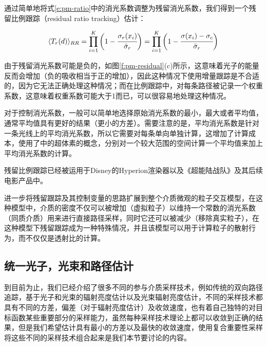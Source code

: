通过简单地将式\ref{e:pm-ratio}中的消光系数调整为残留消光系数，我们得到一个残留比例跟踪（residual ratio tracking）估计：

\begin{equation}
	\langle T_r(d)\rangle_{RR}=\prod^{K}_{i=1}\bigg(1- \cfrac{\sigma_r(x_i)}{\bar{\sigma}_r}\bigg)=\prod^{K}_{i=1}\bigg(1- \cfrac{\sigma(x_i)-\sigma_c}{\bar{\sigma}_r}\bigg)
\end{equation}

由于残留消光系数可能是负的，如图\ref{f:pm-residual}(c)所示，这意味着光子的能量反而会增加（负的吸收相当于正的增加），因此这种情况下使用增量跟踪是不合适的，因为它无法正确处理这种情况；而在比例跟踪中，对每条路径被记录一个权重系数，这意味着权重系数可能大于1而已，可以很容易地处理这种情况。

对于控制消光系数，一般可以简单地选择原始消光系数的最小，最大或者平均值，通常平均值具有更好的结果（更小的方差）。需要注意的是，平均消光系数是针对一条光线上的平均消光系数，所以它需要对每条单向单独计算，这增加了计算成本，\cite{a:ResidualRatioTrackingforEstimatingAttenuationinParticipatingMedia}使用了\cite{a:FreePathSamplinginHighResolutionInhomogeneousParticipatingMedia}中的超体素的概念，分别对一个较大范围的空间计算一个平均值来加上平均消光系数的计算。

残留比例跟踪已经被运用于Disney的Hyperion渲染器\cite{a:ResidualRatioTrackingforEstimatingAttenuationinParticipatingMedia}以及《超能陆战队》\cite{a:BigHero6:IntothePortal}及其后续电影产品中。

\cite{a:UnbiasedLightTransportEstimatorsforInhomogeneousParticipatingMedia}进一步将残留跟踪及其控制变量的思路扩展到整个介质微观的粒子交互模型，在这种模型中，介质的密度不仅可以被增加（虚拟粒子）以维持一个常数的消光系数（同质介质）用来进行直接路径采样，同时它还可以被减少（移除真实粒子），在这种模型下残留跟踪成为一种特殊情况，并且该模型可以用于计算粒子的散射行为，而不仅仅是透射比的计算。





\subsection{统一光子，光束和路径估计}\label{sec:pm-upbp}
到目前为止，我们已经介绍了很多不同的参与介质采样技术，例如传统的双向路径追踪，基于光子和光束的辐射亮度估计以及光束辐射亮度估计，不同的采样技术都具有不同的方差，偏差（对于辐射亮度估计）及收敛速度，也有着自己独特的对目标函数某些重要部分的采样能力，虽然每种采样技术理论上都可以收敛到正确的结果，但是我们希望估计具有最小的方差以及最快的收敛速度，使用复合重要性采样将这些不同的采样技术组合起来是我们本节要讨论的内容。

